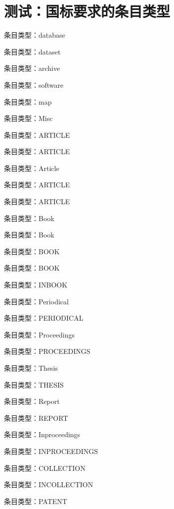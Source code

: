 \documentclass[twoside]{article}
\begin{document}
    \section{测试：国标要求的条目类型}
    \begin{refsection}
    条目类型：database\cite{databaseeg}

条目类型：dataset\cite{dataseteg}

条目类型：archive\cite{archiveeg}

条目类型：software\cite{softwareeg}

条目类型：map\cite{mapeg}

条目类型：Misc\cite{Misceg}

条目类型：ARTICLE\cite{aritileeg}

条目类型：ARTICLE\cite{方军雄2007所有制}

条目类型：Article\cite{abx2007-500-503}

条目类型：ARTICLE\cite{杨洪升2013-56-75}

条目类型：ARTICLE\cite{丁文祥2000--}

条目类型：Book\cite{Yi2014--}

条目类型：Book\cite{Yi2013--}

条目类型：BOOK\cite{张伯伟2002--}

条目类型：BOOK\cite{国家环境保护局科技标准司1996-2-3}

条目类型：INBOOK\cite{白书农1998-146-163}

条目类型：Periodical\cite{AAAS1883--}

条目类型：PERIODICAL\cite{中华医学会湖北分会1984--}

条目类型：Proceedings\cite{ROSENTHALL1963--}

条目类型：PROCEEDINGS\cite{雷光春2012--}

条目类型：Thesis\cite{CALMS1965--}

条目类型：THESIS\cite{马欢2011-27-27}

条目类型：Report\cite{WHO1970--}

条目类型：REPORT\cite{汤万金2013-09-30--}

条目类型：Inproceedings\cite{FOURNEY1971-17-38}

条目类型：INPROCEEDINGS\cite{贾东琴2011-45-52}

条目类型：COLLECTION\cite{中国职工教育研究会1985--}

条目类型：INCOLLECTION\cite{韩吉人1985-90-99}

条目类型：PATENT\cite{张凯军2012-04-05--}

    \printbibliography
    \end{refsection}
\end{document}
